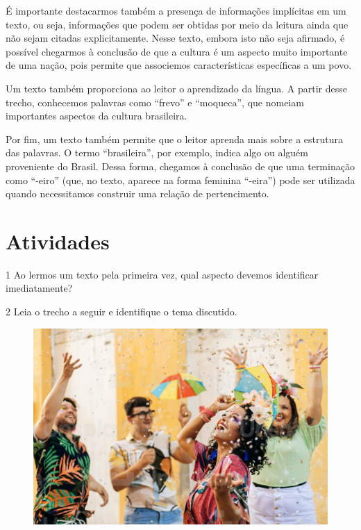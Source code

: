 {É importante destacarmos também a presença de informações implícitas em
um texto, ou seja, informações que podem ser obtidas por meio da leitura
ainda que não sejam citadas explicitamente. Nesse texto, embora isto
não seja afirmado, é possível chegarmos à conclusão de que a cultura é
um aspecto muito importante de uma nação, pois permite que associemos
características específicas a um povo.

Um texto também proporciona ao leitor o aprendizado da língua. A partir
desse trecho, conhecemos palavras como “frevo” e
“moqueca”, que nomeiam importantes aspectos da cultura brasileira.

Por fim, um texto também permite que o leitor aprenda mais sobre a
estrutura das palavras. O termo “brasileira”, por exemplo, indica algo ou alguém proveniente do Brasil. Dessa forma, chegamos
à conclusão de que uma terminação como “-eiro” (que, no texto, aparece na forma feminina “-eira”) pode ser utilizada
quando necessitamos construir uma relação de pertencimento.}

\pagebreak

\section*{Atividades}

\num{1}  Ao lermos um texto pela primeira vez, qual aspecto devemos identificar imediatamente?


\num{2} Leia o trecho a seguir e identifique o tema discutido.

\begin{figure}[htpb!]
\includegraphics[width=\textwidth]{./imgs/img2.jpg}
\end{figure}

